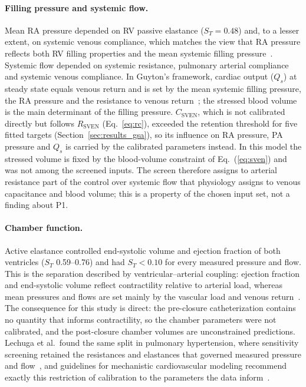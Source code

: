 \documentclass{article}
\begin{document}
\paragraph{Filling pressure and systemic flow.} Mean RA pressure depended on RV passive elastance ($S_T = 0.48$) and, to a lesser extent, on systemic venous compliance, which matches the view that RA pressure reflects both RV filling properties and the mean systemic filling pressure~\cite{Persichini2022}. Systemic flow depended on systemic resistance, pulmonary arterial compliance and systemic venous compliance. In Guyton's framework, cardiac output ($Q_s$) at steady state equals venous return and is set by the mean systemic filling pressure, the RA pressure and the resistance to venous return~\cite{Persichini2022}; the stressed blood volume is the main determinant of the filling pressure. $C_{\mathrm{SVEN}}$, which is not calibrated directly but follows $R_{\mathrm{SVEN}}$ (Eq.~\ref{eq:rc}), exceeded the retention threshold for five fitted targets (Section~\ref{sec:results_gsa}), so its influence on RA pressure, PA pressure and $Q_s$ is carried by the calibrated parameters instead. In this model the stressed volume is fixed by the blood-volume constraint of Eq.~(\ref{eq:sven}) and was not among the screened inputs. The screen therefore assigns to arterial resistance part of the control over systemic flow that physiology assigns to venous capacitance and blood volume; this is a property of the chosen input set, not a finding about P1.

\paragraph{Chamber function.} Active elastance controlled end-systolic volume and ejection fraction of both ventricles ($S_T$ 0.59--0.76) and had $S_T < 0.10$ for every measured pressure and flow. This is the separation described by ventricular--arterial coupling: ejection fraction and end-systolic volume reflect contractility relative to arterial load, whereas mean pressures and flows are set mainly by the vascular load and venous return~\cite{Vriz2021,Persichini2022}. The consequence for this study is direct: the pre-closure catheterization contains no quantity that informs contractility, so the chamber parameters were not calibrated, and the post-closure chamber volumes are unconstrained predictions. Lechuga et al.\ found the same split in pulmonary hypertension, where sensitivity screening retained the resistances and elastances that governed measured pressure and flow~\cite{Lechuga2026}, and guidelines for mechanistic cardiovascular modeling recommend exactly this restriction of calibration to the parameters the data inform~\cite{Colebank2024Guidelines,Colunga2023}.
\end{document}
